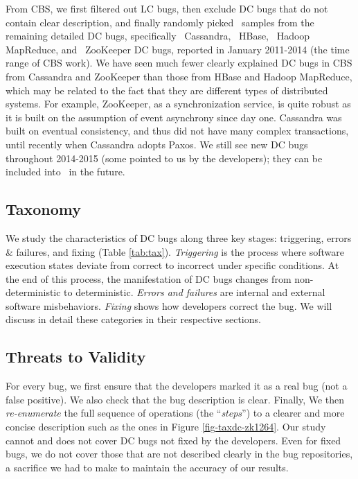 From CBS, we first filtered out LC bugs, then exclude 
DC bugs that do not contain clear description, and finally
randomly picked \numDcBugs\ samples
from the remaining detailed DC bugs, specifically \numDcCA\
Cassandra, \numDcHB\ HBase, \numDcMR\ Hadoop MapReduce, and \numDcZK\
ZooKeeper DC bugs, reported in January 2011-2014 (the time range of
CBS work).  
We have seen much fewer clearly explained DC bugs in CBS from 
Cassandra and ZooKeeper than those from HBase and Hadoop MapReduce, which 
may be related to the fact that they are different types of distributed
systems.  For example,  ZooKeeper, as a
synchronization service, is quite robust as it is built on the
assumption of event asynchrony since day one. Cassandra was built on
eventual consistency, and thus did not have many complex transactions,
until recently when Cassandra adopts Paxos.  We still see new DC bugs
throughout 2014-2015 (some pointed to us by the developers); they can
be included into \tdc\ in the future.




\subsection{Taxonomy}
\label{met-tax}




We study the characteristics of DC
bugs along three key stages: triggering, errors \& failures, and
fixing (Table \ref{tab:tax}).
%
{\it Triggering} is the process where software execution states
deviate from correct to incorrect under specific conditions.  At the
end of this process, the manifestation of DC bugs changes from
non-deterministic to deterministic.
%
{\it Errors and failures} are internal and external software
misbehaviors.
%
{\it Fixing} shows how developers correct the bug.  We
will discuss in detail these categories in their respective sections.

\subsection{Threats to Validity}
\label{met-valid}

For every bug, we first ensure that the developers marked it as a real bug (not
a false positive).  We also check that the bug description is clear. Finally, We
then {\em re-enumerate} the full sequence of operations (the ``{\em steps}'') to
a clearer and more concise description such as the ones in Figure
\ref{fig-taxdc-zk1264}. 
%
Our study cannot and does not cover DC bugs not fixed by the developers.  Even
for fixed bugs, we do not cover those that are not described clearly in the bug
repositories, a sacrifice we had to make to maintain the accuracy of our
results.  

